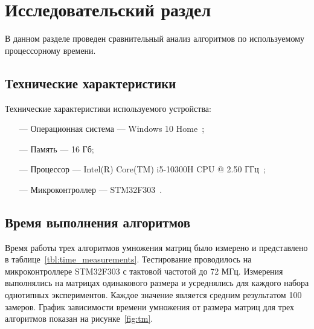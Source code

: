 \chapter{Исследовательский раздел}
В данном разделе проведен сравнительный анализ алгоритмов по используемому процессорному времени.

\section{Технические характеристики}
Технические характеристики используемого устройства:
\begin{itemize}
    \item[---] Операционная система --- Windows 10 Home~\cite{Windows};
    \item[---] Память --- 16 Гб;
    \item[---] Процессор --- Intel(R) Core(TM) i5-10300H CPU @ 2.50 ГГц~\cite{Intel};
    \item[---] Микроконтроллер --- STM32F303~\cite{STM}.
\end{itemize}


\section{Время выполнения алгоритмов}
Время работы трех алгоритмов умножения матриц было измерено и представлено в таблице~\ref{tbl:time_measurements}. Тестирование проводилось на микроконтроллере STM32F303 с тактовой частотой до 72 МГц. Измерения выполнялись на матрицах одинакового размера и усреднялись для каждого набора однотипных экспериментов. Каждое значение является средним результатом 100 замеров. График зависимости времени умножения от размера матриц для трех алгоритмов показан на рисунке~\ref{fig:tm}.

